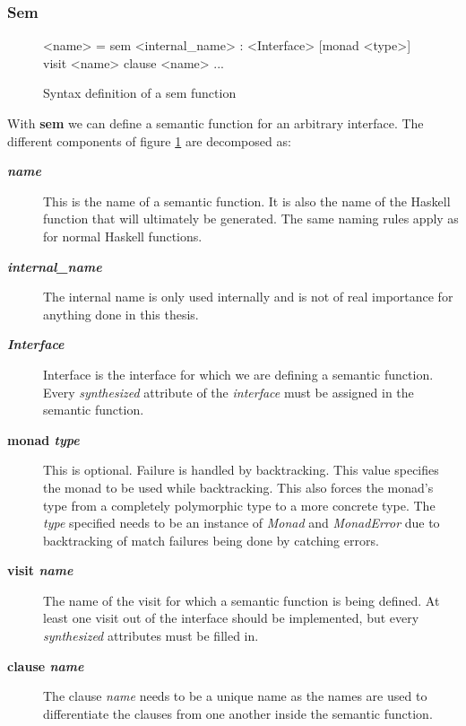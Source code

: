 \subsubsection{Sem}
\begin{figure}[!h]
\begin{code}
<name> = sem <internal_name> : <Interface> [monad <type>]
          {visit <name>
             {clause <name>
                ...
             }
          }
\end{code}
\caption{Syntax definition of a sem function}
\label{sem:syntax}
\end{figure}

With \textbf{sem} we can define a semantic function for an arbitrary interface. The different components of figure \ref{sem:syntax} are decomposed as:

\begin{description}
\item[\textbf{\textit{name}}] This is the name of a semantic function. It is also the name of the Haskell function that will ultimately be generated. The same naming rules apply as for normal Haskell functions.
\item[\textbf{\textit{internal\_name}}] The internal name is only used internally and is not of real importance for anything done in this thesis.
\item[\textbf{\textit{Interface}}] Interface is the interface for which we are defining a semantic function. Every \emph{synthesized} attribute of the \emph{interface} must be assigned in the semantic function.
\item[\textbf{monad \textit{type}}] { This is optional. Failure is handled by backtracking. This value specifies the monad to be used while backtracking. This also forces the monad's type from a completely polymorphic type to a more concrete type. The \textit{type} specified needs to be an instance of \emph{Monad} and \emph{MonadError} due to backtracking of match failures being done by catching errors.}
\item[\textbf{visit \textit{name}}] The name of the visit for which a semantic function is being defined. At least one visit out of the interface should be implemented, but every \emph{synthesized} attributes must be filled in.
\item[\textbf{clause \textit{name}}] The clause \textit{name} needs to be a unique name as the names are used to differentiate the clauses from one another inside the semantic function.
\end{description}

